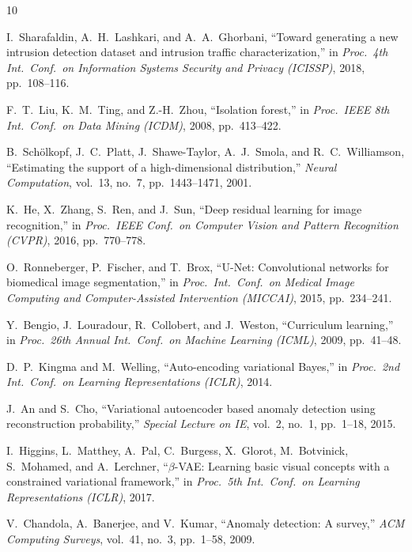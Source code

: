 \documentclass[conference]{IEEEtran}
\begin{document}
\begin{thebibliography}{10}

I.\ Sharafaldin, A.\ H.\ Lashkari, and A.\ A.\ Ghorbani,
``Toward generating a new intrusion detection dataset and intrusion traffic
characterization,''
in \textit{Proc.\ 4th Int.\ Conf.\ on Information Systems Security and Privacy
(ICISSP)}, 2018, pp.\ 108--116.

F.\ T.\ Liu, K.\ M.\ Ting, and Z.-H.\ Zhou,
``Isolation forest,''
in \textit{Proc.\ IEEE 8th Int.\ Conf.\ on Data Mining (ICDM)}, 2008,
pp.\ 413--422.

B.\ Sch\"olkopf, J.\ C.\ Platt, J.\ Shawe-Taylor, A.\ J.\ Smola, and
R.\ C.\ Williamson,
``Estimating the support of a high-dimensional distribution,''
\textit{Neural Computation}, vol.\ 13, no.\ 7, pp.\ 1443--1471, 2001.

K.\ He, X.\ Zhang, S.\ Ren, and J.\ Sun,
``Deep residual learning for image recognition,''
in \textit{Proc.\ IEEE Conf.\ on Computer Vision and Pattern Recognition
(CVPR)}, 2016, pp.\ 770--778.

O.\ Ronneberger, P.\ Fischer, and T.\ Brox,
``U-Net: Convolutional networks for biomedical image segmentation,''
in \textit{Proc.\ Int.\ Conf.\ on Medical Image Computing and Computer-Assisted
Intervention (MICCAI)}, 2015, pp.\ 234--241.

Y.\ Bengio, J.\ Louradour, R.\ Collobert, and J.\ Weston,
``Curriculum learning,''
in \textit{Proc.\ 26th Annual Int.\ Conf.\ on Machine Learning (ICML)}, 2009,
pp.\ 41--48.

D.\ P.\ Kingma and M.\ Welling,
``Auto-encoding variational Bayes,''
in \textit{Proc.\ 2nd Int.\ Conf.\ on Learning Representations (ICLR)}, 2014.

J.\ An and S.\ Cho,
``Variational autoencoder based anomaly detection using reconstruction
probability,''
\textit{Special Lecture on IE}, vol.\ 2, no.\ 1, pp.\ 1--18, 2015.

I.\ Higgins, L.\ Matthey, A.\ Pal, C.\ Burgess, X.\ Glorot, M.\ Botvinick,
S.\ Mohamed, and A.\ Lerchner,
``$\beta$-VAE: Learning basic visual concepts with a constrained variational
framework,''
in \textit{Proc.\ 5th Int.\ Conf.\ on Learning Representations (ICLR)}, 2017.

V.\ Chandola, A.\ Banerjee, and V.\ Kumar,
``Anomaly detection: A survey,''
\textit{ACM Computing Surveys}, vol.\ 41, no.\ 3, pp.\ 1--58, 2009.

\end{thebibliography}
\end{document}
